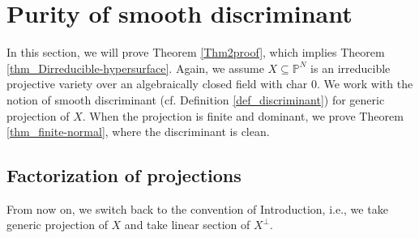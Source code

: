 \documentclass[12pt]{amsart}
\begin{document}
\section{Purity of smooth discriminant}\label{sec_purity}
In this section, we will prove Theorem \ref{Thm2proof}, which implies Theorem \ref{thm_Dirreducible-hypersurface}. Again, we assume $X\subseteq\mathbb P^N$ is an irreducible projective variety over an algebraically closed field with char $0$. We work with the notion of smooth discriminant (cf. Definition \ref{def_discriminant}) for generic projection of $X$. When the projection is finite and dominant, we prove Theorem \ref{thm_finite-normal}, where the discriminant is clean.

\subsection{Factorization of projections}
From now on, we switch back to the convention of Introduction, i.e., we take generic projection of $X$ and take linear section of $X^{\perp}$.
\end{document}
